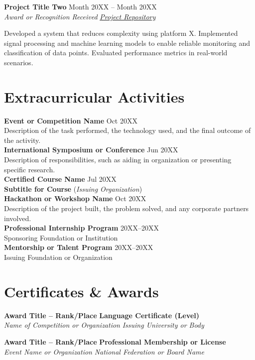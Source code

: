 \documentclass[11pt,a4paper]{article}
\newcommand{\entry}[4]{
  \noindent \textbf{#1} \hfill #2 \vspace{-3pt}\\
  \textit{#3} \hfill \textit{#4} \par
  \vspace{4pt}
}
\newcommand{\entryy}[4]{
  \noindent \textbf{#1} \hfill #2 \vspace{-1pt}\\
  \textit{#3} \hfill \textit{#4} \par
  \vspace{4pt}
}
\begin{document}
\vspace{6pt}
\entryy{Project Title Two}{Month 20XX -- Month 20XX}{Award or Recognition Received}{\href{https://github.com/loremipsum}{Project Repository}}
\vspace{-5pt} {\small Developed a system that reduces complexity using platform X. Implemented signal processing and machine learning models to enable reliable monitoring and classification of data points. Evaluated performance metrics in real-world scenarios.}


\section{Extracurricular Activities}
\textbf{Event or Competition Name} \hfill Oct 20XX \vspace{-3pt} \\
\small{Description of the task performed, the technology used, and the final outcome of the activity.} \vspace{6pt}\\
\normalsize{\textbf{International Symposium or Conference} \hfill Jun 20XX} \vspace{-3pt}\\
\small{Description of responsibilities, such as aiding in organization or presenting specific research.} \vspace{6pt}\\ 
\normalsize{\textbf{Certified Course Name}} \hfill Jul 20XX \vspace{-3pt}\\ 
\textbf{Subtitle for Course} (\textit{Issuing Organization}) \vspace{6pt}\\
\textbf{Hackathon or Workshop Name} \hfill Oct 20XX \vspace{-3pt}\\
\small{Description of the project built, the problem solved, and any corporate partners involved.} \vspace{6pt}\\
\normalsize{\textbf{Professional Internship Program} \hfill 20XX--20XX} \vspace{-3pt}\\
\small{Sponsoring Foundation or Institution} \vspace{6pt}\\
\normalsize{\textbf{Mentorship or Talent Program} \hfill 20XX--20XX} \vspace{-3pt}\\
\small{Issuing Foundation or Organization}


\section{Certificates \& Awards}
\entry{Award Title -- Rank/Place}{\textbf{Language Certificate (Level)}}{Name of Competition or Organization}{Issuing University or Body}
\entry{Award Title -- Rank/Place}{\textbf{Professional Membership or License}}{Event Name or Organization}{National Federation or Board Name}
\end{document}
